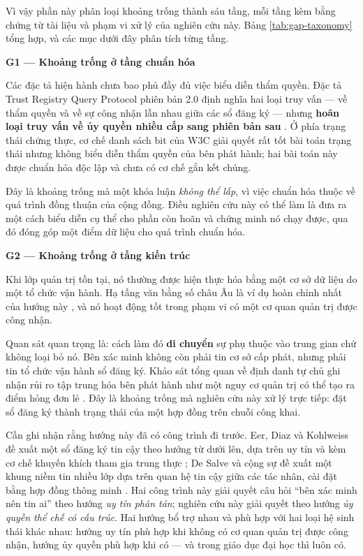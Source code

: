 Vì vậy phần này phân loại khoảng trống thành sáu tầng, mỗi tầng kèm bằng chứng từ tài liệu và phạm vi xử lý của nghiên cứu này. Bảng \ref{tab:gap-taxonomy} tổng hợp, và các mục dưới đây phân tích từng tầng.



\noindent \textbf{G1 --- Khoảng trống ở tầng chuẩn hóa}

Các đặc tả hiện hành chưa bao phủ đầy đủ việc biểu diễn thẩm quyền. Đặc tả Trust Registry Query Protocol phiên bản 2.0 định nghĩa hai loại truy vấn --- về thẩm quyền và về sự công nhận lẫn nhau giữa các sổ đăng ký --- nhưng \textbf{hoãn loại truy vấn về ủy quyền nhiều cấp sang phiên bản sau} \cite{ToIP_TRQP2026}. Ở phía trạng thái chứng thực, cơ chế danh sách bit của W3C \cite{W3C_BitstringStatusList2025} giải quyết rất tốt bài toán trạng thái nhưng không biểu diễn thẩm quyền của bên phát hành; hai bài toán này được chuẩn hóa độc lập và chưa có cơ chế gắn kết chúng.

Đây là khoảng trống mà một khóa luận \emph{không thể lấp}, vì việc chuẩn hóa thuộc về quá trình đồng thuận của cộng đồng. Điều nghiên cứu này có thể làm là đưa ra một cách biểu diễn cụ thể cho phần còn hoãn và chứng minh nó chạy được, qua đó đóng góp một điểm dữ liệu cho quá trình chuẩn hóa.

\noindent \textbf{G2 --- Khoảng trống ở tầng kiến trúc}

Khi lớp quản trị tồn tại, nó thường được hiện thực hóa bằng một cơ sở dữ liệu do một tổ chức vận hành. Hạ tầng văn bằng số châu Âu là ví dụ hoàn chỉnh nhất của hướng này \cite{EBSI_TrustModel}, và nó hoạt động tốt trong phạm vi có một cơ quan quản trị được công nhận.

Quan sát quan trọng là: cách làm đó \textbf{di chuyển} sự phụ thuộc vào trung gian chứ không loại bỏ nó. Bên xác minh không còn phải tin cơ sở cấp phát, nhưng phải tin tổ chức vận hành sổ đăng ký. Khảo sát tổng quan về định danh tự chủ ghi nhận rủi ro tập trung hóa bên phát hành như một nguy cơ quản trị có thể tạo ra điểm hỏng đơn lẻ \cite{SSI_Survey2025}. Đây là khoảng trống mà nghiên cứu này xử lý trực tiếp: đặt sổ đăng ký thành trạng thái của một hợp đồng trên chuỗi công khai.

Cần ghi nhận rằng hướng này đã có công trình đi trước. Eer, Diaz và Kohlweiss đề xuất một sổ đăng ký tin cậy theo hướng từ dưới lên, dựa trên uy tín và kèm cơ chế khuyến khích tham gia trung thực \cite{Eer2022}; De Salve và cộng sự đề xuất một khung niềm tin nhiều lớp dựa trên quan hệ tin cậy giữa các tác nhân, cài đặt bằng hợp đồng thông minh \cite{DeSalve2023}. Hai công trình này giải quyết câu hỏi {``}bên xác minh nên tin ai{''} theo hướng \emph{uy tín phân tán}; nghiên cứu này giải quyết theo hướng \emph{ủy quyền thể chế có cấu trúc}. Hai hướng bổ trợ nhau và phù hợp với hai loại hệ sinh thái khác nhau: hướng uy tín phù hợp khi không có cơ quan quản trị được công nhận, hướng ủy quyền phù hợp khi có --- và trong giáo dục đại học thì luôn có.

